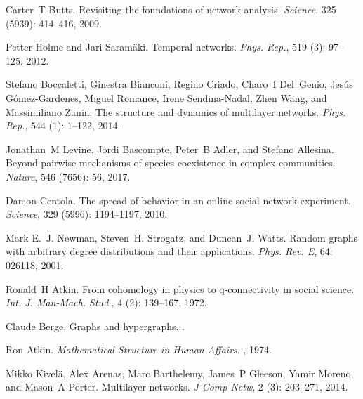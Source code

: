 Carter~T Butts.
\newblock Revisiting the foundations of network analysis.
\newblock \emph{Science}, 325 (5939): 414--416, 2009.

Petter Holme and Jari Saram{\"a}ki.
\newblock Temporal networks.
\newblock \emph{Phys. Rep.}, 519 (3): 97--125, 2012.

Stefano Boccaletti, Ginestra Bianconi, Regino Criado, Charo~I Del~Genio,
Jes{\'u}s {G{\'o}mez-Gardenes}, Miguel Romance, Irene {Sendina-Nadal}, Zhen
Wang, and Massimiliano Zanin.
\newblock The structure and dynamics of multilayer networks.
\newblock \emph{Phys. Rep.}, 544 (1): 1--122, 2014.

Jonathan~M Levine, Jordi Bascompte, Peter~B Adler, and Stefano Allesina.
\newblock Beyond pairwise mechanisms of species coexistence in complex
communities.
\newblock \emph{Nature}, 546 (7656): 56, 2017.

Damon Centola.
\newblock The spread of behavior in an online social network experiment.
\newblock \emph{Science}, 329 (5996): 1194--1197, 2010.

Mark E.~J. Newman, Steven~H. Strogatz, and Duncan~J. Watts.
\newblock Random graphs with arbitrary degree distributions and their
applications.
\newblock \emph{Phys. Rev. E}, 64: 026118, 2001.

Ronald~H Atkin.
\newblock From cohomology in physics to q-connectivity in social science.
\newblock \emph{Int. J. Man-Mach. Stud.}, 4 (2): 139--167,
1972.

Claude Berge.
\newblock Graphs and hypergraphs.
.

Ron Atkin.
\newblock \emph{Mathematical Structure in Human Affairs}.
, 1974.

Mikko Kivel{\"a}, Alex Arenas, Marc Barthelemy, James~P Gleeson, Yamir Moreno,
and Mason~A Porter.
\newblock Multilayer networks.
\newblock \emph{J Comp Netw}, 2 (3): 203--271, 2014.

